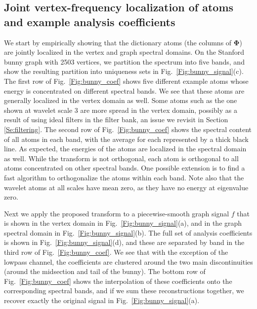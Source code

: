 \documentclass{article}
\begin{document}
\subsection{Joint vertex-frequency localization of atoms and example analysis coefficients}
We start by empirically showing that the dictionary atoms (the columns of $\boldsymbol{\Phi}$) are jointly localized in the vertex and graph spectral domains. On the Stanford bunny graph \cite{bunny} with 2503 vertices, we partition the spectrum into five bands, and show the resulting partition into uniqueness sets 
in Fig.\ \ref{Fig:bunny_signal}(c). The first row of Fig.\ \ref{Fig:bunny_coef} shows five different example atoms whose energy is concentrated on different spectral bands. We see that these atoms are generally localized in the vertex domain as well. Some atoms such as the one shown at wavelet scale 3 are more spread in the vertex domain, possibly as a result of using ideal filters in the filter bank, an issue we revisit in Section \ref{Se:filtering}. The second row of Fig.\ \ref{Fig:bunny_coef} shows the spectral content of all atoms in each band, with the average for each represented by a thick black line. As expected, the energies of the atoms are localized in the spectral domain as well. While the transform is not orthogonal, each atom is orthogonal to all atoms concentrated on other spectral bands. One possible extension is to find a fast algorithm to orthogonalize the atoms within each band. Note also that the wavelet atoms at all scales have mean zero, as they have no energy at eigenvalue zero.

Next we apply the proposed transform to a piecewise-smooth graph signal $f$ that is shown in the vertex domain in Fig.\ \ref{Fig:bunny_signal}(a), and in the graph spectral domain in Fig.\ \ref{Fig:bunny_signal}(b). The full set of analysis coefficients is shown in Fig.\ \ref{Fig:bunny_signal}(d), and these are separated by band in the third row of Fig.\ \ref{Fig:bunny_coef}. We see that with the exception of the lowpass channel, the coefficients are clustered around the two main discontinuities (around the midsection and tail of the bunny). The bottom row of Fig.\ \ref{Fig:bunny_coef} shows the interpolation of these coefficients onto the corresponding spectral bands, and if we sum these reconstructions together, we recover exactly the original signal in Fig.\ \ref{Fig:bunny_signal}(a).
\end{document}
